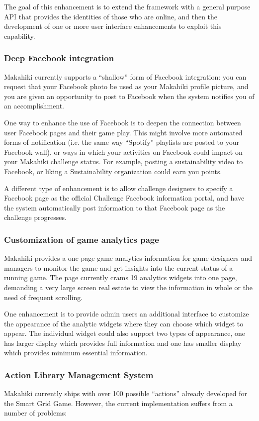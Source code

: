 The goal of this enhancement is to extend the framework with a general purpose API that provides the identities of those who are online, and then the development of one or more user interface enhancements to exploit this capability.

\subsubsection{Deep Facebook integration}
Makahiki currently supports a ``shallow'' form of Facebook integration: you can request that your Facebook photo be used as your Makahiki profile picture, and you are given an opportunity to post to Facebook when the system notifies you of an accomplishment. 

One way to enhance the use of Facebook is to deepen the connection between user Facebook pages and their game play. This might involve more automated forms of notification (i.e. the same way ``Spotify'' playlists are posted to your Facebook wall), or ways in which your activities on Facebook could impact on your Makahiki challenge status. For example, posting a sustainability video to Facebook, or liking a Sustainability organization could earn you points. 

A different type of enhancement is to allow challenge designers to specify a Facebook page as the official Challenge Facebook information portal, and have the system automatically post information to that Facebook page as the challenge progresses.

\subsubsection{Customization of game analytics page}
\label{sec:future-game-manage}
Makahiki provides a one-page game analytics information for game designers and managers to monitor the game and get insights into the current status of a running game. The page currently crams 19 analytics widgets into one page, demanding a very large screen real estate to view the information in whole or the need of frequent scrolling. 

One enhancement is to provide admin users an additional interface to customize the appearance of the analytic widgets where they can choose which widget to appear. The individual widget could also support two types of appearance, one has larger display which provides full information and one has smaller display which provides minimum essential information. 

\subsubsection{Action Library Management System}
Makahiki currently ships with over 100 possible  ``actions'' already developed for the Smart Grid Game. However, the current implementation suffers from a number of problems:

